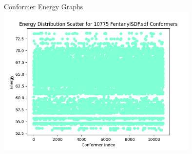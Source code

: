 \documentclass{beamer}
\begin{document}
\begin{frame}{Conformer Energy Graphs}
\includegraphics[width=10cm]{img/Graphs/FentanylSDF_Energy_Scatter.png}
\end{frame}
\end{document}
